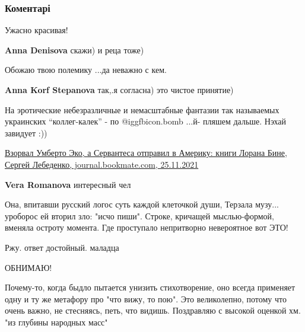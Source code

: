  
 
 
 
 
\subsubsection{Коментарі}

\begin{itemize} %
Ужасно красивая!


\textbf{Anna Denisova} скажи) и реца тоже)

Обожаю твою полемику ...да неважно с кем.

\textbf{Anna Korf Stepanova} так,.я согласна) это чистое принятие)


На эротические небезразличные и немасштабные фантазии так называемых украинских
\enquote{коллег-калек} - по @igg{fbicon.bomb} ...й- пляшем дальше. Нэхай завидует :))

\href{https://journal.bookmate.com/vzorval-umberto-eko-otpravil-servantesa-v-ameriku-jizn-i-knigi-lorana-bine/}{%
Взорвал Умберто Эко, а Сервантеса отправил в Америку: книги Лорана Бине, Сергей Лебеденко, %
journal.bookmate.com, 25.11.2021%
}

\textbf{Vera Romanova} интересный чел


\obeycr
Она, впитавши русский логос
суть каждой клеточкой души,
Терзала музу... уроборос
ей вторил зло: "исчо пиши".
Строке, кричащей мыслью-формой,
вменяла остроту момента.
Где проступало непритворно
невероятное вот ЭТО!
\restorecr

Ржу. ответ достойный. маладца

ОБНИМАЮ!


Почему-то, когда быдло пытается унизить стихотворение, оно всегда применяет
одну и ту же метафору про "что вижу, то пою".  Это великолепно, потому что
очень важно, не стесняясь, петь, что видишь. Поздравляю с высокой оценкой хм.
"из глубины народных масс"

\end{itemize} %
